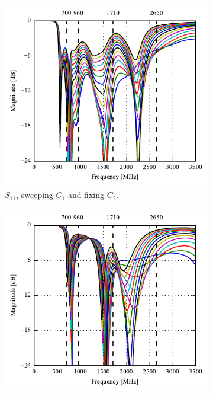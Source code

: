 \begin{figure}[htbp]
   \begin{subfigure}[b]{0.49\linewidth}
        \centering
        \includegraphics{img/tech_sol/trianglefeed/read_mode/Csh1s11.pdf}
        \caption{$S_{11}$, sweeping $C_1$ and fixing $C_2$.}
    \end{subfigure}
    \hfill
    \begin{subfigure}[b]{0.49\linewidth}
        \centering
        \includegraphics{img/tech_sol/trianglefeed/read_mode/Csh2s22.pdf}

\end{subfigure}
\end{figure}
